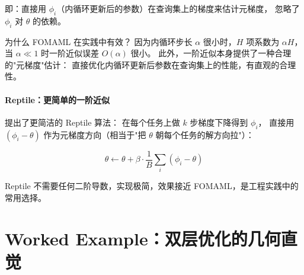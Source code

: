 即：直接用 $\phi_i$（内循环更新后的参数）在查询集上的梯度来估计元梯度，
忽略了 $\phi_i$ 对 $\theta$ 的依赖。

\begin{remark}
为什么 FOMAML 在实践中有效？
因为内循环步长 $\alpha$ 很小时，$H$ 项系数为 $\alpha H$，
当 $\alpha \ll 1$ 时一阶近似误差 $O(\alpha)$ 很小。
此外，一阶近似本身提供了一种合理的"元梯度"估计：
直接优化内循环更新后参数在查询集上的性能，有直观的合理性。
\end{remark}

\paragraph{Reptile：更简单的一阶近似}

\citet{nichol2018reptile} 提出了更简洁的 Reptile 算法：
在每个任务上做 $k$ 步梯度下降得到 $\phi_i$，
直接用 $(\phi_i - \theta)$ 作为元梯度方向（相当于"把 $\theta$ 朝每个任务的解方向拉"）：

\begin{equation}
  \theta \leftarrow \theta + \beta \cdot \frac{1}{B} \sum_i (\phi_i - \theta)
  \label{eq:reptile}
\end{equation}

Reptile 不需要任何二阶导数，实现极简，效果接近 FOMAML，是工程实践中的常用选择。

\section{Worked Example：双层优化的几何直觉}
\label{sec:bilevel_geometry}

